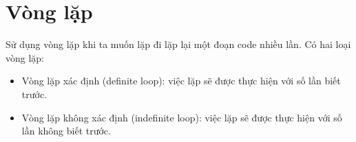 \section{Vòng lặp}
Sử dụng vòng lặp khi ta muốn lặp đi lặp lại một đoạn code nhiều lần. Có hai loại vòng lặp:
\begin{itemize}
	\itemsep\setlength{0em}
	\item Vòng lặp xác định (definite loop): việc lặp sẽ được thực hiện với số lần biết trước.
	\item Vòng lặp không xác định (indefinite loop): việc lặp sẽ được thực hiện với số lần không biết trước.
\end{itemize}
\newpage


